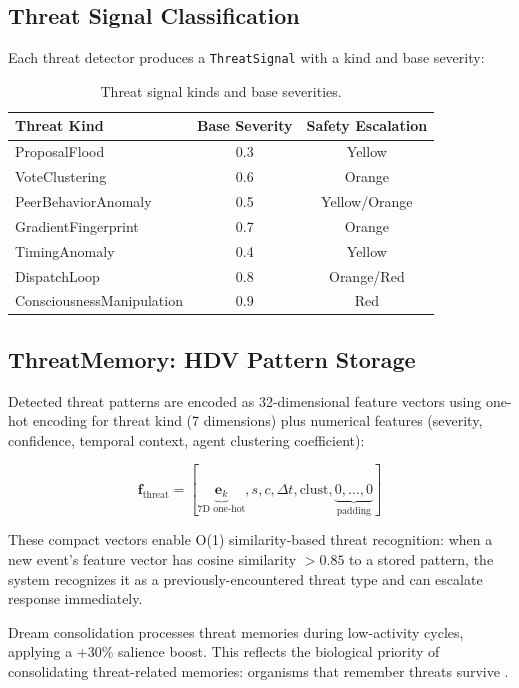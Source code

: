 \documentclass[11pt,a4paper]{article}
\begin{document}
\subsection{Threat Signal Classification}

Each threat detector produces a \texttt{ThreatSignal} with a kind and base severity:

\begin{table}[h]
\centering
\caption{Threat signal kinds and base severities.}
\label{tab:threat_severity}
\begin{tabular}{lcc}
\toprule
\textbf{Threat Kind} & \textbf{Base Severity} & \textbf{Safety Escalation} \\
\midrule
ProposalFlood & 0.3 & Yellow \\
VoteClustering & 0.6 & Orange \\
PeerBehaviorAnomaly & 0.5 & Yellow/Orange \\
GradientFingerprint & 0.7 & Orange \\
TimingAnomaly & 0.4 & Yellow \\
DispatchLoop & 0.8 & Orange/Red \\
ConsciousnessManipulation & 0.9 & Red \\
\bottomrule
\end{tabular}
\end{table}

\subsection{ThreatMemory: HDV Pattern Storage}

Detected threat patterns are encoded as 32-dimensional feature vectors using one-hot encoding for threat kind (7 dimensions) plus numerical features (severity, confidence, temporal context, agent clustering coefficient):

\begin{equation}
\mathbf{f}_{\text{threat}} = [\underbrace{\mathbf{e}_k}_{\text{7D one-hot}}, s, c, \Delta t, \text{clust}, \underbrace{0, \ldots, 0}_{\text{padding}}]
\end{equation}

These compact vectors enable O(1) similarity-based threat recognition: when a new event's feature vector has cosine similarity $> 0.85$ to a stored pattern, the system recognizes it as a previously-encountered threat type and can escalate response immediately.

Dream consolidation processes threat memories during low-activity cycles, applying a +30\% salience boost. This reflects the biological priority of consolidating threat-related memories: organisms that remember threats survive \citep{walker2017}.
\end{document}
